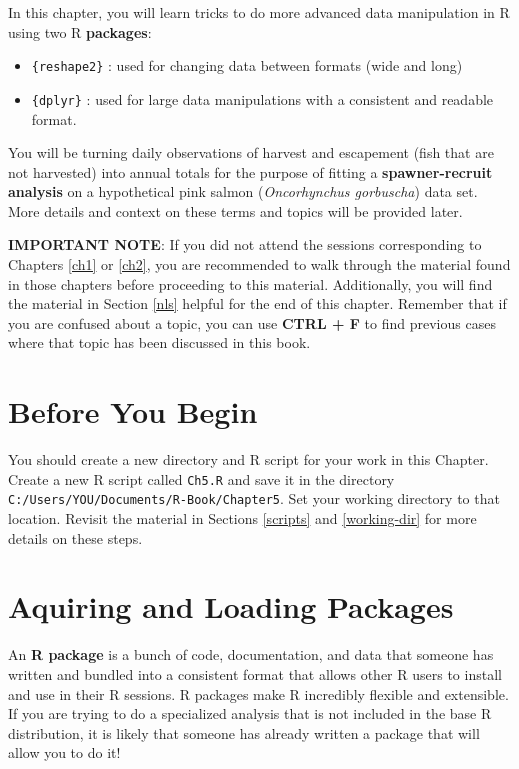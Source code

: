 \documentclass[]{book}
\providecommand{\tightlist}{%
  \setlength{\itemsep}{0pt}\setlength{\parskip}{0pt}}
\theoremstyle{definition}
\theoremstyle{definition}
\theoremstyle{definition}
\theoremstyle{remark}
\begin{document}
In this chapter, you will learn tricks to do more advanced data
manipulation in R using two R \textbf{packages}:

\begin{itemize}
\tightlist
\item
  \texttt{\{reshape2\}} \citep{R-reshape2}: used for changing data
  between formats (wide and long)
\item
  \texttt{\{dplyr\}} \citep{R-dplyr}: used for large data manipulations
  with a consistent and readable format.
\end{itemize}

You will be turning daily observations of harvest and escapement (fish
that are not harvested) into annual totals for the purpose of fitting a
\textbf{spawner-recruit analysis} on a hypothetical pink salmon
(\emph{Oncorhynchus gorbuscha}) data set. More details and context on
these terms and topics will be provided later.

\textbf{IMPORTANT NOTE}: If you did not attend the sessions
corresponding to Chapters \ref{ch1} or \ref{ch2}, you are recommended to
walk through the material found in those chapters before proceeding to
this material. Additionally, you will find the material in Section
\ref{nls} helpful for the end of this chapter. Remember that if you are
confused about a topic, you can use \textbf{CTRL + F} to find previous
cases where that topic has been discussed in this book.

\section*{Before You Begin}\label{before-you-begin-3}

You should create a new directory and R script for your work in this
Chapter. Create a new R script called \texttt{Ch5.R} and save it in the
directory \texttt{C:/Users/YOU/Documents/R-Book/Chapter5}. Set your
working directory to that location. Revisit the material in Sections
\ref{scripts} and \ref{working-dir} for more details on these steps.

\section{Aquiring and Loading
Packages}\label{aquiring-and-loading-packages}

An \textbf{R package} is a bunch of code, documentation, and data that
someone has written and bundled into a consistent format that allows
other R users to install and use in their R sessions. R packages make R
incredibly flexible and extensible. If you are trying to do a
specialized analysis that is not included in the base R distribution, it
is likely that someone has already written a package that will allow you
to do it!
\end{document}

